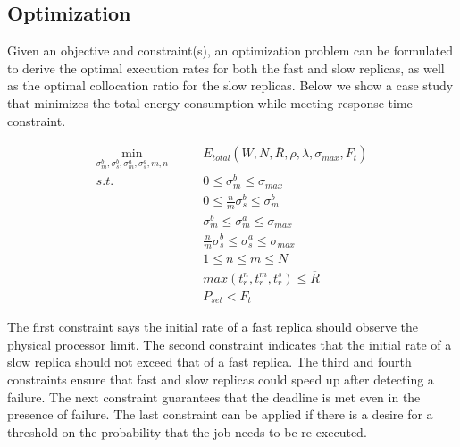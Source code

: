 \subsection{Optimization}
\label{sec:crash_opt}
Given an objective and constraint(s), an optimization problem can be formulated to derive the optimal execution rates for both the fast and slow replicas, as well as the optimal collocation ratio for the slow replicas. Below we show a case study that minimizes the total energy consumption while meeting response time constraint. 

\begin{equation}
\begin{alignedat}{2}
\min_{\sigma_m^b,\sigma_s^b,\sigma_m^a,\sigma_s^a, m, n} \qquad  & E_{total}(W,N,\overline{R},\rho,\lambda,\sigma_{max},F_t) \\
s.t.  \qquad          & 0 \leq \sigma_m^b \leq \sigma_{max} \\
                      & 0 \leq \frac{n}{m}\sigma_s^b \leq \sigma_m^b \\
                     & \sigma_m^b \leq \sigma_m^a \leq \sigma_{max} \\
                     & \frac{n}{m}\sigma_s^b \leq \sigma_s^a \leq \sigma_{max} \\
                     & 1 \leq n \leq m \leq N \\
                      & max(t_r^n, t_r^m, t_r^s) \leq \overline{R} \\
                      & P_{set} < F_t
\end{alignedat}
\end{equation}

The first constraint says the initial rate of a fast replica should observe the physical processor limit. The second constraint indicates that the initial rate of a slow replica should not exceed that of a fast replica. The third and fourth constraints ensure that fast and slow replicas could speed up after detecting a failure. The next constraint guarantees that the deadline is met even in the presence of failure. 
The last constraint can be applied if there is a desire for a threshold on the probability that the job needs to be re-executed.